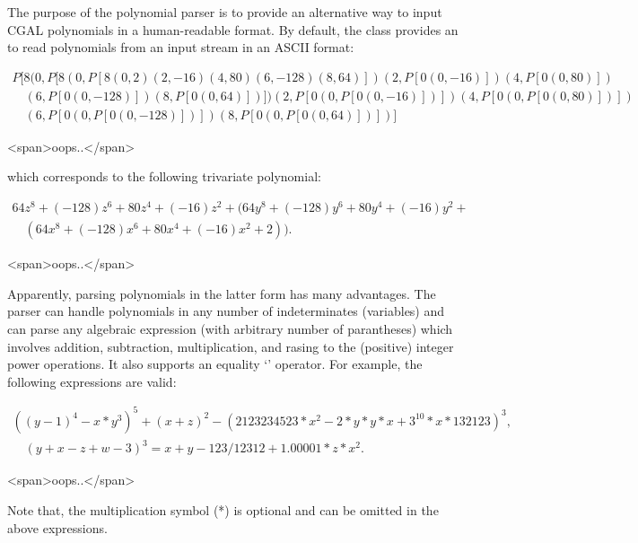 The purpose of the polynomial parser is to provide an alternative way to input CGAL polynomials in a human-readable format. By default, the class  provides an  to read polynomials from an input stream in an ASCII format:
\begin{ccTexOnly}
\[
\begin{array}{l}
P[8(0,P[8(0,P[8(0,2)(2,-16)(4,80)(6,-128)(8,64)])(2,P[0(0,-16)])(4,P[0(0,80)])\\
\quad {}(6,P[0(0,-128)])(8,P[0(0,64)])])(2,P[0(0,P[0(0,-16)])])(4,P[0(0,P[0(0,80)])])\\
\quad {}(6,P[0(0,P[0(0,-128)])])(8,P[0(0,P[0(0,64)])])]
\end{array}
\]
\end{ccTexOnly}
\begin{ccHtmlOnly}
<span>oops..</span>
\end{ccHtmlOnly}
\noindent which corresponds to the following trivariate polynomial:
\begin{ccTexOnly}
\[\begin{array}{l}
64z^8 + (-128)z^6 + 80z^4 + (-16)z^2 + (64y^8 + (-128)y^6 + 80y^4 + (-16)y^2 + \\
\quad {}(64x^8 + (-128)x^6 + 80x^4 + (-16)x^2 + 2)).
\end{array}\]
\end{ccTexOnly}
\begin{ccHtmlOnly}
<span>oops..</span>
\end{ccHtmlOnly}
\noindent Apparently, parsing polynomials in the latter form has many advantages.
The parser can handle polynomials in any number of indeterminates (variables) and 
can parse any algebraic expression (with arbitrary number of parantheses) 
which involves addition, subtraction, multiplication,
and rasing to the (positive) integer power operations. It also supports an equality `\ccc{=}' operator. 
For example, the following expressions are valid: 
\begin{ccTexOnly}
\[\begin{array}{l}
((y-1)^4 - x*y^3)^5 + (x + z)^2 - (2123234523*x^2 - 2*y*y*x + 3^{10}*x*132123)^3,\\
\quad {}(y + x - z + w - 3)^3 = x + y - 123/12312 + 1.00001*z*x^2.
\end{array}\]
\end{ccTexOnly}
\begin{ccHtmlOnly}
<span>oops..</span>
\end{ccHtmlOnly}
Note that, the multiplication symbol (*) is optional and can be omitted in the above expressions.

